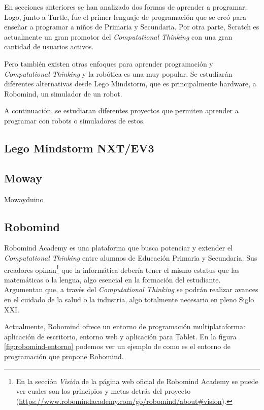 En secciones anteriores se han analizado dos formas de aprender a programar. Logo, junto a Turtle, fue el primer lenguaje de programación que se creó para enseñar a programar a niños de Primaria y Secundaria. Por otra parte, Scratch es actualmente un gran promotor del \emph{Computational Thinking} con una gran cantidad de usuarios activos.


Pero también existen otras enfoques para aprender programación y \emph{Computational Thinking} y la robótica es una muy popular. Se estudiarán diferentes alternativas desde Lego Mindstorm, que es principalmente hardware, a Robomind, un simulador de un robot.

A continuación, se estudiaran diferentes proyectos que permiten aprender a programar con robots o simuladores de estos.


\subsection{Lego Mindstorm NXT/EV3}
\label{sec:lego-nxt-ec3}



\subsection{Moway}
\label{sec:moway}


Mowayduino



\subsection{Robomind}
\label{sec:robomind}


Robomind Academy\cite{robomind-web} es una plataforma que busca potenciar y extender el \emph{Computational Thinking} entre alumnos de Educación Primaria y Secundaria. Sus creadores opinan\footnote{En la sección \emph{Visión} de la página web oficial de Robomind Academy se puede ver cuales son los principios y metas detrás del proyecto (\url{https://www.robomindacademy.com/go/robomind/about#vision}).} que la informática debería tener el mismo estatus que las matemáticas o la lengua, algo esencial en la formación del estudiante. Argumentan que, a través del \emph{Computational Thinking} se podrán realizar avances en el cuidado de la salud o la industria, algo totalmente necesario en pleno Siglo XXI. 


Actualmente, Robomind ofrece un entorno de programación multiplataforma: aplicación de escritorio, entorno web y aplicación para Tablet. En la figura \ref{fig:robomind-entorno} podemos ver un ejemplo de como es el entorno de programación que propone Robomind.


